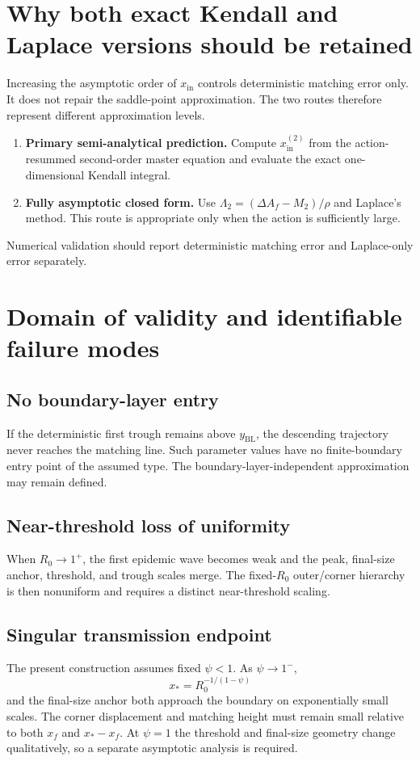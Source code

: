 \documentclass[11pt]{article}
\newcommand{\Rzero}{R_0}
\newcommand{\xf}{x_f}
\newcommand{\xs}{x_*}
\newcommand{\yin}{y_{\mathrm{BL}}}
\newcommand{\xin}{x_{\mathrm{in}}}
\begin{document}
\section{Why both exact Kendall and Laplace versions should be retained}
Increasing the asymptotic order of \(\xin\) controls deterministic matching error only. It does not repair the saddle-point approximation. The two routes therefore represent different approximation levels.
\begin{enumerate}
\item \textbf{Primary semi-analytical prediction.} Compute \(\xin^{(2)}\) from the action-resummed second-order master equation and evaluate the exact one-dimensional Kendall integral.
\item \textbf{Fully asymptotic closed form.} Use \(\Lambda_2=(\Delta A_f-M_2)/\rho\) and Laplace's method. This route is appropriate only when the action is sufficiently large.
\end{enumerate}
Numerical validation should report deterministic matching error and Laplace-only error separately.

\section{Domain of validity and identifiable failure modes}

\subsection{No boundary-layer entry}
If the deterministic first trough remains above \(\yin\), the descending trajectory never reaches the matching line. Such parameter values have no finite-boundary entry point of the assumed type. The boundary-layer-independent approximation may remain defined.

\subsection{Near-threshold loss of uniformity}
When \(\Rzero\to1^+\), the first epidemic wave becomes weak and the peak, final-size anchor, threshold, and trough scales merge. The fixed-\(\Rzero\) outer/corner hierarchy is then nonuniform and requires a distinct near-threshold scaling.

\subsection{Singular transmission endpoint}
The present construction assumes fixed \(\psi<1\). As \(\psi\to1^-\),
\[
\xs=\Rzero^{-1/(1-\psi)}
\]
and the final-size anchor both approach the boundary on exponentially small scales. The corner displacement and matching height must remain small relative to both \(\xf\) and \(\xs-\xf\). At \(\psi=1\) the threshold and final-size geometry change qualitatively, so a separate asymptotic analysis is required.
\end{document}
